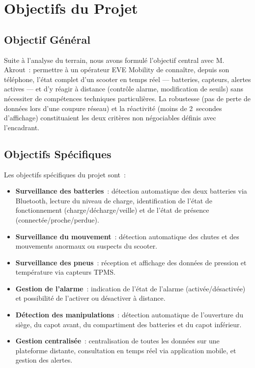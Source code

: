 \documentclass[12pt, a4paper]{report}
\begin{document}
\section{Objectifs du Projet}

\subsection{Objectif Général}

Suite à l'analyse du terrain, nous avons formulé l'objectif central avec M. Akrout~:
permettre à un opérateur EVE Mobility de connaître, depuis son téléphone, l'état
complet d'un scooter en temps réel --- batteries, capteurs, alertes actives --- et
d'y réagir à distance (contrôle alarme, modification de seuils) sans nécessiter de
compétences techniques particulières. La robustesse (pas de perte de données lors
d'une coupure réseau) et la réactivité (moins de 2~secondes d'affichage) constituaient
les deux critères non négociables définis avec l'encadrant.

\subsection{Objectifs Spécifiques}

Les objectifs spécifiques du projet sont~:

\begin{itemize}
  \item \textbf{Surveillance des batteries}~: détection automatique des deux batteries
        via Bluetooth, lecture du niveau de charge, identification de l'état de
        fonctionnement (charge/décharge/veille) et de l'état de présence
        (connectée/proche/perdue).
  \item \textbf{Surveillance du mouvement}~: détection automatique des chutes et
        des mouvements anormaux ou suspects du scooter.
  \item \textbf{Surveillance des pneus}~: réception et affichage des données de
        pression et température via capteurs TPMS.
  \item \textbf{Gestion de l'alarme}~: indication de l'état de l'alarme
        (activée/désactivée) et possibilité de l'activer ou désactiver à distance.
  \item \textbf{Détection des manipulations}~: détection automatique de l'ouverture
        du siège, du capot avant, du compartiment des batteries et du capot inférieur.
  \item \textbf{Gestion centralisée}~: centralisation de toutes les données sur
        une plateforme distante, consultation en temps réel via application mobile,
        et gestion des alertes.
\end{itemize}
\end{document}

